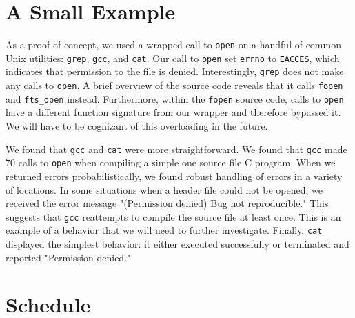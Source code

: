 \documentclass[10pt]{article}
\begin{document}
\section{A Small Example}
As a proof of concept, we used a wrapped call to \texttt{open} on a handful of common Unix utilities: \texttt{grep}, \texttt{gcc}, and \texttt{cat}. Our call to \texttt{open} set \texttt{errno} to \texttt{EACCES}, which indicates that permission to the file is denied. Interestingly, \texttt{grep} does not make any calls to \texttt{open}. A brief overview of the source code reveals that it calls \texttt{fopen} and \texttt{fts\_open} instead. Furthermore, within the \texttt{fopen} source code, calls to \texttt{open} have a different function signature from our wrapper and therefore bypassed it. We will have to be cognizant of this overloading in the future.

We found that \texttt{gcc} and \texttt{cat} were more straightforward. We found that \texttt{gcc} made 70 calls to \texttt{open} when compiling a simple one source file C program. When we returned errors probabilistically, we found robust handling of errors in a variety of locations. In some situations when a header file could not be opened, we received the error message "(Permission denied) Bug not reproducible." This suggests that \texttt{gcc} reattempts to compile the source file at least once. This is an example of a behavior that we will need to further investigate. Finally, \texttt{cat} displayed the simplest behavior: it either executed successfully or terminated and reported "Permission denied."


\section{Schedule}
\end{document}

